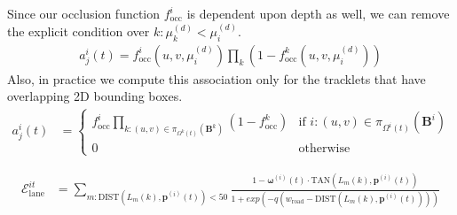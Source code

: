\documentclass{beamer} %
\newcommand{\pos}[2]{\mathbf{p}^{(#1)}(#2)}
\newcommand{\ori}[2]{\mathbf{\omega}^{(#1)}(#2)}
\newcommand{\relp}[2]{\Omega^{#1}(#2)}
\newcommand{\projectionOfi}[2]{\pi_{\relp{#1}{t}}(#2)}
\newcommand{\projectionOf}[1]{\projectionOfi{i}{#1}}
\newcommand{\dimsn}[1]{\mathbf{B}^{#1}}
\newcommand{\Energy}[1]{\mathcal{E}^{it}_{\text{#1}}}
\begin{document}
\begin{frame}
  Since our occlusion function $f^i_{\text{occ}}$ is dependent upon depth as
  well, we can remove the explicit condition over $k:{\mu^{(d)}_k < \mu^{(d)}_i}$.
  \begin{align}
    a^i_j(t) = f^i_{\text{occ}}(u, v, \mu^{(d)}_i)\prod_{k}(1 - f^k_{\text{occ}}(u, v, \mu^{(d)}_i))
  \end{align}
  Also, in practice we compute this association only for the tracklets that
  have overlapping 2D bounding boxes.
  \begin{align}
    a^i_j(t) &= \begin{cases}
    f^i_{\text{occ}}
    \prod\limits_{k : (u,v) \in \projectionOfi{k}{\dimsn{k}}}
    (1 - f^k_{\text{occ}})
    & \text{if } i : (u,v) \in \projectionOf{\dimsn{i}} \\
    0 & \text{otherwise}
    \end{cases}
  \end{align}
\end{frame}


\begin{frame}

  \begin{align}
    \Energy{lane} &= 
    \sum_{m : \text{DIST}(L_{m}(k), \pos{i}{t}) < 50}\frac{1 - \ori{i}{t} \cdot \text{TAN}(L_{m}(k),
    \pos{i}{t}) }
    {1 + exp(-q(w_{\text{road}} - \text{DIST}(L_{m}(k), \pos{i}{t})))}
  \end{align}
\end{frame}
\end{document}
